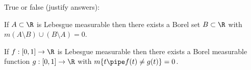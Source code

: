 True or false (justify answers):
\begin{alist}
\item If $A\subset \R$ is Lebesgue measurable then there exists a
Borel set $B\subset \R$ with $m(A\setminus B)\cup (B \setminus A)=0$.
\item If $f:[0,1]\rightarrow \R$ is Lebesgue measurable then there
exists a Borel measurable function $g:[0,1]\rightarrow \R$ with
$m\{t \pipe f(t)\neq g(t)\}=0$.
\end{alist}
